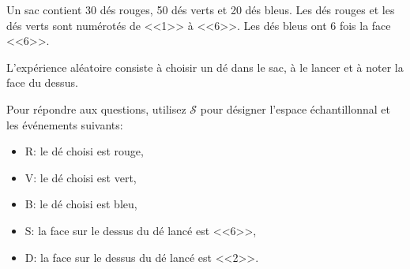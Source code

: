 \begin{questions}

\pageblanche
\question Un sac contient 30 dés rouges, 50 dés verts et 20 dés bleus.
Les dés rouges et les dés verts sont numérotés de <<1>> à <<6>>.
Les dés bleus ont 6 fois la face <<6>>.

L'expérience aléatoire consiste à choisir un dé dans le sac, à le lancer et à noter la face du dessus.

Pour répondre aux questions, utilisez $\mathcal{S}$ pour désigner l'espace échantillonnal et les événements suivants:

\begin{itemize}
    \item R: le dé choisi est rouge,
    \item V: le dé choisi est vert,
    \item B: le dé choisi est bleu,
    \item S: la face sur le dessus du dé lancé est <<6>>,
    \item D: la face sur le dessus du dé lancé est <<2>>.
\end{itemize}

\end{questions}
